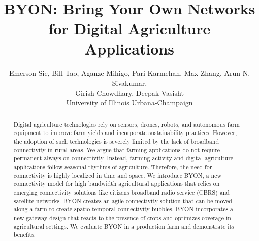 \documentclass[sigconf,10pt]{acmart}
\newcommand{\name}{BYON}
\begin{document}
\title[\name: Bring Your Own Networks]{\LARGE \bf \name: Bring Your Own Networks for Digital Agriculture Applications}


\author{\large Emerson Sie, Bill Tao, Aganze Mihigo, Pari Karmehan, Max Zhang, Arun N. Sivakumar, \\ Girish Chowdhary, Deepak Vasisht \\ \vspace{0.1in} University of Illinois Urbana-Champaign}

\renewcommand{\shortauthors}{X.et al.}

\begin{abstract}
Digital agriculture technologies rely on sensors, drones, robots, and autonomous farm equipment to improve farm yields and incorporate sustainability practices. However, the adoption of such technologies is severely limited by the lack of broadband connectivity in rural areas. We argue that farming applications do not require permanent always-on connectivity. Instead, farming activity and digital agriculture applications follow seasonal rhythms of agriculture. Therefore, the need for connectivity is highly localized in time and space. We introduce BYON, a new connectivity model for high bandwidth agricultural applications that relies on emerging connectivity solutions like citizens broadband radio service (CBRS) and satellite networks. BYON creates an agile connectivity solution that can be moved along a farm to create spatio-temporal connectivity bubbles. BYON incorporates a new gateway design that reacts to the presence of crops and optimizes coverage in agricultural settings.  We evaluate BYON in a production farm and demonstrate its benefits.\vspace{-0.2in}
\end{abstract}

\maketitle
\pagestyle{plain}













\clearpage 

{ 
}
\end{document}
